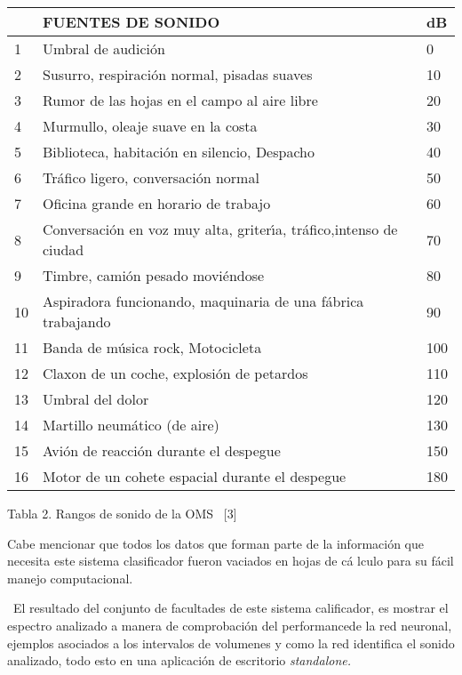 \begin{center}
\begin{tabular}{|l|l|l|}
\hline
& FUENTES DE SONIDO & dB \\ \hline
1 & Umbral de audici\'{o}n & 0 \\ \hline
2 & Susurro, respiraci\'{o}n normal, pisadas suaves & 10 \\ \hline
3 & Rumor de las hojas en el campo al aire libre & 20 \\ \hline
4 & Murmullo, oleaje suave en la costa & 30 \\ \hline
5 & Biblioteca, habitaci\'{o}n en silencio, Despacho & 40 \\ \hline
6 & Tr\'{a}fico ligero, conversaci\'{o}n normal & 50 \\ \hline
7 & Oficina grande en horario de trabajo & 60 \\ \hline
8 & Conversaci\'{o}n en voz muy alta, griter\'{\i}a, tr\'{a}fico,intenso de
ciudad & 70 \\ \hline
9 & Timbre, cami\'{o}n pesado movi\'{e}ndose & 80 \\ \hline
10 & Aspiradora funcionando, maquinaria de una f\'{a}brica trabajando & 90
\\ \hline
11 & Banda de m\'{u}sica rock, Motocicleta & 100 \\ \hline
12 & Claxon de un coche, explosi\'{o}n de petardos & 110 \\ \hline
13 & Umbral del dolor & 120 \\ \hline
14 & Martillo neum\'{a}tico (de aire) & 130 \\ \hline
15 & Avi\'{o}n de reacci\'{o}n durante el despegue & 150 \\ \hline
16 & Motor de un cohete espacial durante el despegue & 180 \\ \hline
\end{tabular}

Tabla 2. Rangos de sonido de la OMS \ [3]
\end{center}

Cabe mencionar que todos los datos que forman parte de la informaci\'{o}n
que necesita este sistema clasificador fueron vaciados en hojas de c\'{a}%
lculo para su f\'{a}cil manejo computacional.\

\ El resultado del conjunto de facultades de este sistema calificador, es
mostrar el espectro analizado a manera de comprobaci\'{o}n del
performance\bigskip de la red neuronal, ejemplos asociados a los intervalos
de volumenes y como la red identifica el sonido analizado, todo esto en una
aplicaci\'{o}n de escritorio \textit{standalone.}

